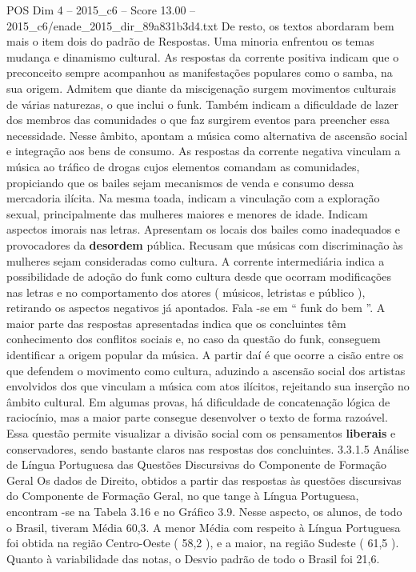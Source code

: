 \begin{textsample}{POS Dim 4 – 2015\_c6 – Score 13.00 – 2015\_c6/enade\_2015\_dir\_89a831b3d4.txt}
De resto, os textos abordaram bem mais o item dois do padrão de Respostas.
Uma minoria enfrentou os temas mudança e dinamismo cultural.
As respostas da corrente positiva indicam que o preconceito sempre acompanhou as manifestações populares como o samba, na sua origem.
Admitem que diante da miscigenação surgem movimentos culturais de várias naturezas, o que inclui o funk.
Também indicam a dificuldade de lazer dos membros das comunidades o que faz surgirem eventos para preencher essa necessidade.
Nesse âmbito, apontam a música como alternativa de ascensão social e integração aos bens de consumo.
As respostas da corrente negativa vinculam a música ao tráfico de drogas cujos elementos comandam as comunidades, propiciando que os bailes sejam mecanismos de venda e consumo dessa mercadoria ilícita.
Na mesma toada, indicam a vinculação com a exploração sexual, principalmente das mulheres maiores e menores de idade.
Indicam aspectos imorais nas letras.
Apresentam os locais dos bailes como inadequados e provocadores da \textbf{desordem} pública.
Recusam que músicas com discriminação às mulheres sejam consideradas como cultura.
A corrente intermediária indica a possibilidade de adoção do funk como cultura desde que ocorram modificações nas letras e no comportamento dos atores ( músicos, letristas e público ), retirando os aspectos negativos já apontados.
Fala -se em “ funk do bem ”.
A maior parte das respostas apresentadas indica que os concluintes têm conhecimento dos conflitos sociais e, no caso da questão do funk, conseguem identificar a origem popular da música.
A partir daí é que ocorre a cisão entre os que defendem o movimento como cultura, aduzindo a ascensão social dos artistas envolvidos dos que vinculam a música com atos ilícitos, rejeitando sua inserção no âmbito cultural.
Em algumas provas, há dificuldade de concatenação lógica de raciocínio, mas a maior parte consegue desenvolver o texto de forma razoável.
Essa questão permite visualizar a divisão social com os pensamentos \textbf{liberais} e conservadores, sendo bastante claros nas respostas dos concluintes. 3.3.1.5 Análise de Língua Portuguesa das Questões Discursivas do Componente de Formação Geral Os dados de Direito, obtidos a partir das respostas às questões discursivas do Componente de Formação Geral, no que tange à Língua Portuguesa, encontram -se na Tabela 3.16 e no Gráfico 3.9.
Nesse aspecto, os alunos, de todo o Brasil, tiveram Média 60,3.
A menor Média com respeito à Língua Portuguesa foi obtida na região Centro-Oeste ( 58,2 ), e a maior, na região Sudeste ( 61,5 ).
Quanto à variabilidade das notas, o Desvio padrão de todo o Brasil foi 21,6.

\end{textsample}
